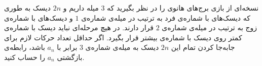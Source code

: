 \EXERCISE
نسخه‌ای از بازی برج‌های هانوی را در نظر بگیرید که
$3$
میله داریم و
$2n$
دیسک به طوری که دیسک‌های با شماره‌ی فرد به ترتیب در میله‌ی شماره‌ی
$1$
و دیسک‌های با شماره‌ی زوج به ترتیب در میله‌ی شماره‌ی
$2$
قرار دارند. در هیچ مرحله‌ای نباید دیسک با شماره‌ی کمتر روی دیسک با شماره‌ی بیشتر قرار بگیرد. اگر حداقل تعداد حرکات لازم برای جابه‌جا کردن تمام این
$2n$
دیسک به میله‌ی شماره‌ی
$3$
برابر با
$a_n$
باشد، رابطه‌ی بازگشتی
$a_n$
را حساب کنید.